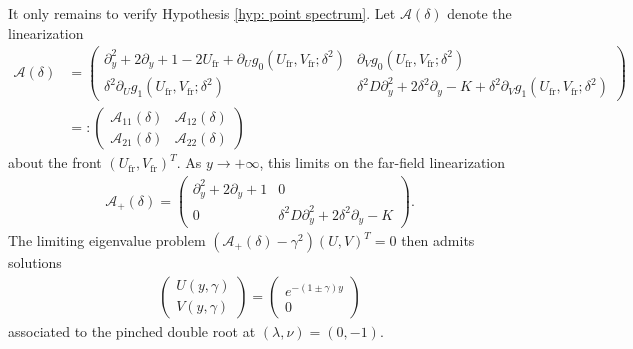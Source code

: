 \documentclass[11pt]{article}
\numberwithin{equation}{section}
\numberwithin{prop}{section}
\begin{document}
It only remains to verify Hypothesis \ref{hyp: point spectrum}. Let $\mathcal{A}(\delta)$ denote the linearization
\begin{align}
	\mathcal{A}(\delta) &= \begin{pmatrix}
		\partial_y^2 + 2 \partial_y + 1 - 2 U_\mathrm{fr} + \partial_U g_0 (U_\mathrm{fr}, V_\mathrm{fr}; \delta^2) & \partial_V g_0 (U_\mathrm{fr}, V_\mathrm{fr}; \delta^2) \\  
		\delta^2 \partial_U g_1 (U_\mathrm{fr}, V_\mathrm{fr}; \delta^2) & \delta^2 D \partial_y^2 + 2 \delta^2 \partial_y - K + \delta^2 \partial_V  g_1 (U_\mathrm{fr}, V_\mathrm{fr}; \delta^2)
	\end{pmatrix} \\
	&= :\begin{pmatrix}
		\mathcal{A}_{11}(\delta) & \mathcal{A}_{12}(\delta) \\
		\mathcal{A}_{21}(\delta) & \mathcal{A}_{22} (\delta)
	\end{pmatrix}
\end{align}
about the front $(U_\mathrm{fr}, V_\mathrm{fr})^T$. As $y \to +\infty$, this limits on the far-field linearization
\begin{align}
	\mathcal{A}_+(\delta) = \begin{pmatrix}
		\partial_y^2 + 2 \partial_y + 1 & 0 \\
		0 & \delta^2 D \partial_y^2 + 2 \delta^2 \partial_y - K 
	\end{pmatrix}. 
\end{align}
The limiting eigenvalue problem $(\mathcal{A}_+(\delta) - \gamma^2) (U,V)^T = 0$ then admits solutions
\begin{align}
	\begin{pmatrix} U(y, \gamma) \\ V(y, \gamma) \end{pmatrix} = \begin{pmatrix} 
		e^{-(1\pm\gamma) y} \\ 0
	\end{pmatrix}
\end{align}
associated to the pinched double root at $(\lambda, \nu) = (0, -1)$. 
\end{document}
